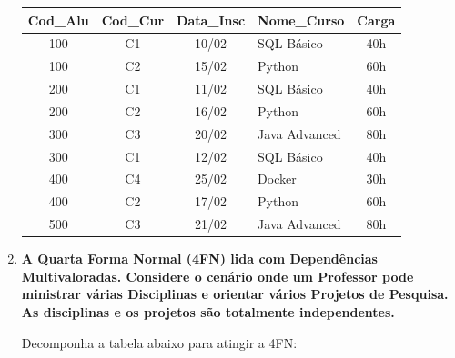 \documentclass[12pt,a4paper]{article}
\newcommand{\resposta}[1]{
\noindent
\framebox[\textwidth]{
\begin{minipage}{0.98\textwidth}
\vspace{#1}
\end{minipage}
}
}
\begin{document}
\begin{enumerate}
    \begin{center}
        \begin{tabularx}{\textwidth}{|c|c|c|X|c|}
            \hline
            \cellcolor{gray!20}\textbf{Cod\_Alu} & \cellcolor{gray!20}\textbf{Cod\_Cur} & \cellcolor{gray!20}\textbf{Data\_Insc} & \cellcolor{gray!20}\textbf{Nome\_Curso} & \cellcolor{gray!20}\textbf{Carga} \\ \hline
            100 & C1 & 10/02 & SQL Básico & 40h \\ \hline
            100 & C2 & 15/02 & Python & 60h \\ \hline
            200 & C1 & 11/02 & SQL Básico & 40h \\ \hline
            200 & C2 & 16/02 & Python & 60h \\ \hline
            300 & C3 & 20/02 & Java Advanced & 80h \\ \hline
            300 & C1 & 12/02 & SQL Básico & 40h \\ \hline
            400 & C4 & 25/02 & Docker & 30h \\ \hline
            400 & C2 & 17/02 & Python & 60h \\ \hline
            500 & C3 & 21/02 & Java Advanced & 80h \\ \hline
        \end{tabularx}
    \end{center}
    \resposta{4cm}

    \item \textbf{A Quarta Forma Normal (4FN) lida com Dependências Multivaloradas. Considere o cenário onde um Professor pode ministrar várias Disciplinas e orientar vários Projetos de Pesquisa. As disciplinas e os projetos são totalmente independentes.}
    
    Decomponha a tabela abaixo para atingir a 4FN:
    

\end{enumerate}
\end{document}

